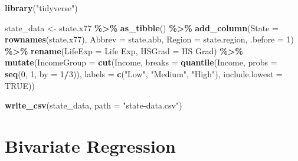 \documentclass[
  12pt,
  oneside,openany]{book}
\newenvironment{Shaded}{\begin{snugshade}}{\end{snugshade}}
\newcommand{\DataTypeTok}[1]{\textcolor[rgb]{0.13,0.29,0.53}{#1}}
\newcommand{\DecValTok}[1]{\textcolor[rgb]{0.00,0.00,0.81}{#1}}
\newcommand{\KeywordTok}[1]{\textcolor[rgb]{0.13,0.29,0.53}{\textbf{#1}}}
\newcommand{\NormalTok}[1]{#1}
\newcommand{\OperatorTok}[1]{\textcolor[rgb]{0.81,0.36,0.00}{\textbf{#1}}}
\newcommand{\OtherTok}[1]{\textcolor[rgb]{0.56,0.35,0.01}{#1}}
\newcommand{\StringTok}[1]{\textcolor[rgb]{0.31,0.60,0.02}{#1}}
\begin{document}
\begin{Shaded}
\begin{Highlighting}[]
\KeywordTok{library}\NormalTok{(}\StringTok{"tidyverse"}\NormalTok{)}

\NormalTok{state\_data \textless{}{-}}\StringTok{ }\NormalTok{state.x77 }\OperatorTok{\%\textgreater{}\%}
\StringTok{  }\KeywordTok{as\_tibble}\NormalTok{() }\OperatorTok{\%\textgreater{}\%}
\StringTok{  }\KeywordTok{add\_column}\NormalTok{(}\DataTypeTok{State =} \KeywordTok{rownames}\NormalTok{(state.x77),}
             \DataTypeTok{Abbrev =}\NormalTok{ state.abb,}
             \DataTypeTok{Region =}\NormalTok{ state.region,}
             \DataTypeTok{.before =} \DecValTok{1}\NormalTok{) }\OperatorTok{\%\textgreater{}\%}
\StringTok{  }\KeywordTok{rename}\NormalTok{(}\DataTypeTok{LifeExp =} \StringTok{\textasciigrave{}}\DataTypeTok{Life Exp}\StringTok{\textasciigrave{}}\NormalTok{,}
         \DataTypeTok{HSGrad =} \StringTok{\textasciigrave{}}\DataTypeTok{HS Grad}\StringTok{\textasciigrave{}}\NormalTok{) }\OperatorTok{\%\textgreater{}\%}
\StringTok{  }\KeywordTok{mutate}\NormalTok{(}\DataTypeTok{IncomeGroup =} \KeywordTok{cut}\NormalTok{(Income,}
                           \DataTypeTok{breaks =} \KeywordTok{quantile}\NormalTok{(Income,}
                                             \DataTypeTok{probs =} \KeywordTok{seq}\NormalTok{(}\DecValTok{0}\NormalTok{, }\DecValTok{1}\NormalTok{, }\DataTypeTok{by =} \DecValTok{1}\OperatorTok{/}\DecValTok{3}\NormalTok{)),}
                           \DataTypeTok{labels =} \KeywordTok{c}\NormalTok{(}\StringTok{"Low"}\NormalTok{, }\StringTok{"Medium"}\NormalTok{, }\StringTok{"High"}\NormalTok{),}
                           \DataTypeTok{include.lowest =} \OtherTok{TRUE}\NormalTok{))}

\KeywordTok{write\_csv}\NormalTok{(state\_data, }\DataTypeTok{path =} \StringTok{"state{-}data.csv"}\NormalTok{)}
\end{Highlighting}
\end{Shaded}

\hypertarget{bivariate}{%
\chapter{Bivariate Regression}\label{bivariate}}

\providecommand{\SSE}{\mathop{\rm SSE}\nolimits}
\providecommand{\RSS}{\mathop{\rm RSS}\nolimits}
\providecommand{\TSS}{\mathop{\rm TSS}\nolimits}
\providecommand{\Cov}{\mathop{\rm Cov}\nolimits}
\providecommand{\pderiv}[2]{\frac{\partial{}#1}{\partial{}#2}}
\end{document}

